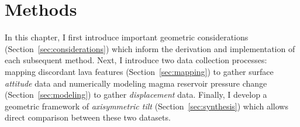 \chapter{Methods}\label{cha:methods}

In this chapter, I first introduce important geometric considerations (Section~\ref{sec:considerations}) which inform the derivation and implementation of each subsequent method. Next, I introduce two data collection processes: mapping discordant lava features (Section~\ref{sec:mapping}) to gather surface \emph{attitude} data and numerically modeling magma reservoir pressure change (Section~\ref{sec:modeling}) to gather \emph{displacement} data. Finally, I develop a geometric framework of \emph{axisymmetric tilt} (Section~\ref{sec:synthesis}) which allows direct comparison between these two datasets.












